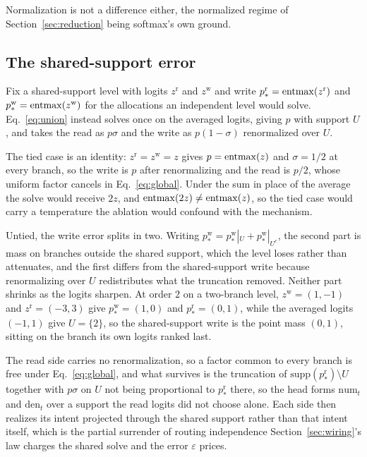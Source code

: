 Normalization is not a difference either, the normalized regime of Section~\ref{sec:reduction} being softmax's own ground.

\subsection{The shared-support error}

Fix a shared-support level with logits $z^{\mathrm{r}}$ and $z^{\mathrm{w}}$ and write $p^{\mathrm{r}}_\ast = \mathrm{entmax}(z^{\mathrm{r}})$ and $p^{\mathrm{w}}_\ast = \mathrm{entmax}(z^{\mathrm{w}})$ for the allocations an independent level would solve. Eq.~\eqref{eq:union} instead solves once on the averaged logits, giving $p$ with support $U$, and takes the read as $p\sigma$ and the write as $p(1-\sigma)$ renormalized over $U$.

The tied case is an identity: $z^{\mathrm{r}} = z^{\mathrm{w}} = z$ gives $p = \mathrm{entmax}(z)$ and $\sigma = 1/2$ at every branch, so the write is $p$ after renormalizing and the read is $p/2$, whose uniform factor cancels in Eq.~\eqref{eq:global}. Under the sum in place of the average the solve would receive $2z$, and $\mathrm{entmax}(2z) \ne \mathrm{entmax}(z)$, so the tied case would carry a temperature the ablation would confound with the mechanism.

Untied, the write error splits in two. Writing $p^{\mathrm{w}}_\ast = p^{\mathrm{w}}_\ast|_{U} + p^{\mathrm{w}}_\ast|_{U^{c}}$, the second part is mass on branches outside the shared support, which the level loses rather than attenuates, and the first differs from the shared-support write because renormalizing over $U$ redistributes what the truncation removed. Neither part shrinks as the logits sharpen. At order $2$ on a two-branch level, $z^{\mathrm{w}} = (1,-1)$ and $z^{\mathrm{r}} = (-3,3)$ give $p^{\mathrm{w}}_\ast = (1,0)$ and $p^{\mathrm{r}}_\ast = (0,1)$, while the averaged logits $(-1,1)$ give $U = \{2\}$, so the shared-support write is the point mass $(0,1)$, sitting on the branch its own logits ranked last.

The read side carries no renormalization, so a factor common to every branch is free under Eq.~\eqref{eq:global}, and what survives is the truncation of $\mathrm{supp}(p^{\mathrm{r}}_\ast) \setminus U$ together with $p\sigma$ on $U$ not being proportional to $p^{\mathrm{r}}_\ast$ there, so the head forms $\mathrm{num}_t$ and $\mathrm{den}_t$ over a support the read logits did not choose alone. Each side then realizes its intent projected through the shared support rather than that intent itself, which is the partial surrender of routing independence Section~\ref{sec:wiring}'s law charges the shared solve and the error $\varepsilon$ prices.

